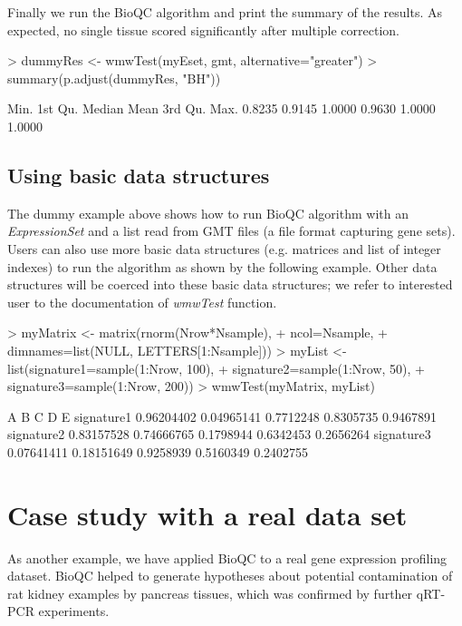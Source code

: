 \documentclass[11pt]{article}
\begin{document}
Finally we run the BioQC algorithm and print the summary of the results. As expected, no single tissue scored significantly after multiple correction.
\begin{Schunk}
\begin{Sinput}
> dummyRes <- wmwTest(myEset, gmt, alternative="greater")
> summary(p.adjust(dummyRes, "BH"))
\end{Sinput}
\begin{Soutput}
   Min. 1st Qu.  Median    Mean 3rd Qu.    Max. 
 0.8235  0.9145  1.0000  0.9630  1.0000  1.0000 
\end{Soutput}
\end{Schunk}

\subsection{Using basic data structures}
The dummy example above shows how to run BioQC algorithm with an \textit{ExpressionSet} and a list read from GMT files (a file format capturing gene sets). Users can also use more basic data structures (e.g. matrices and list of integer indexes) to run the algorithm as shown by the following example. Other data structures will be coerced into these basic data structures; we refer to interested user to the documentation of \textit{wmwTest} function.

\begin{Schunk}
\begin{Sinput}
> myMatrix <- matrix(rnorm(Nrow*Nsample), 
+                    ncol=Nsample, 
+                    dimnames=list(NULL, LETTERS[1:Nsample]))
> myList <- list(signature1=sample(1:Nrow, 100), 
+                signature2=sample(1:Nrow, 50), 
+                signature3=sample(1:Nrow, 200))
> wmwTest(myMatrix, myList)
\end{Sinput}
\begin{Soutput}
                    A          B         C         D         E
signature1 0.96204402 0.04965141 0.7712248 0.8305735 0.9467891
signature2 0.83157528 0.74666765 0.1798944 0.6342453 0.2656264
signature3 0.07641411 0.18151649 0.9258939 0.5160349 0.2402755
\end{Soutput}
\end{Schunk}

\section{Case study with a real data set}
As another example, we have applied BioQC to a real gene expression profiling dataset. BioQC helped to generate hypotheses about potential contamination of rat kidney examples by pancreas tissues, which was confirmed by further qRT-PCR experiments. 
\end{document}
